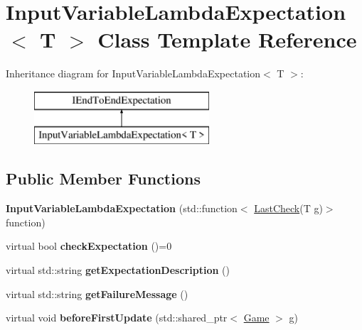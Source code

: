 \hypertarget{classInputVariableLambdaExpectation}{}\section{Input\+Variable\+Lambda\+Expectation$<$ T $>$ Class Template Reference}
\label{classInputVariableLambdaExpectation}
Inheritance diagram for Input\+Variable\+Lambda\+Expectation$<$ T $>$\+:\begin{figure}[H]
\begin{center}
\leavevmode
\includegraphics[height=2.000000cm]{classInputVariableLambdaExpectation}
\end{center}
\end{figure}
\subsection*{Public Member Functions}
\begin{DoxyCompactItemize}
\item 
{\bfseries Input\+Variable\+Lambda\+Expectation} (std\+::function$<$ \hyperlink{structLastCheck}{Last\+Check}(T g)$>$ function)\hypertarget{classInputVariableLambdaExpectation_ac9794f1924b77227fc9859c868e63b73}{}\label{classInputVariableLambdaExpectation_ac9794f1924b77227fc9859c868e63b73}

\item 
virtual bool {\bfseries check\+Expectation} ()=0\hypertarget{classInputVariableLambdaExpectation_a866389623dbd679eee788a2e80a015f4}{}\label{classInputVariableLambdaExpectation_a866389623dbd679eee788a2e80a015f4}

\item 
virtual std\+::string {\bfseries get\+Expectation\+Description} ()\hypertarget{classInputVariableLambdaExpectation_a02add21b9ce74870e39df32c246f4f6a}{}\label{classInputVariableLambdaExpectation_a02add21b9ce74870e39df32c246f4f6a}

\item 
virtual std\+::string {\bfseries get\+Failure\+Message} ()\hypertarget{classInputVariableLambdaExpectation_a7754bdc92f200f5b4ca9c79bb1239deb}{}\label{classInputVariableLambdaExpectation_a7754bdc92f200f5b4ca9c79bb1239deb}

\item 
virtual void {\bfseries before\+First\+Update} (std\+::shared\+\_\+ptr$<$ \hyperlink{classGame}{Game} $>$ g)\hypertarget{classInputVariableLambdaExpectation_a4254116127ddac8c61a03bb258eb662c}{}\label{classInputVariableLambdaExpectation_a4254116127ddac8c61a03bb258eb662c}

\end{DoxyCompactItemize}
